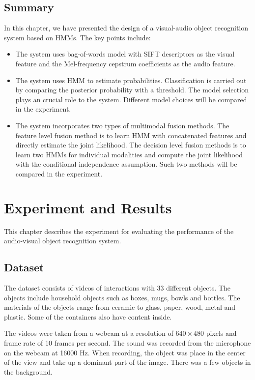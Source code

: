 \documentclass[12pt,final,twoside]{report}
\begin{document}
\section{Summary}
In this chapter, we have presented the design of a visual-audio object recognition system based on HMMs. The key points include:
\begin{itemize}
  \item The system uses bag-of-words model with SIFT descriptors as the visual feature and the Mel-frequency cepstrum coefficients as the audio feature.
  \item The system uses HMM to estimate probabilities. Classification is carried out by comparing the posterior probability with a threshold. The model selection plays an crucial role to the system. Different model choices will be compared in the experiment.
  \item The system incorporates two types of multimodal fusion methods. The feature level fusion method is to learn HMM with concatenated features and directly estimate the joint likelihood. The decision level fusion methods is to learn two HMMs for individual modalities and compute the joint likelihood with the conditional independence assumption. Such two methods will be compared in the experiment.
\end{itemize}

\cleardoublepage
\chapter{Experiment and Results}
This chapter describes the experiment for evaluating the performance of the audio-visual object recognition system. 

\section{Dataset}
The dataset consists of videos of interactions with 33 different objects. The objects include household objects such as boxes, mugs, bowls and bottles. The materials of the objects range from ceramic to glass, paper, wood, metal and plastic. Some of the containers also have content inside.

The videos were taken from a webcam at a resolution of $640 \times 480$ pixels and frame rate of 10 frames per second. The sound was recorded from the microphone on the webcam at 16000 Hz. When recording, the object was place in the center of the view and take up a dominant part of the image. There was a few objects in the background.
\end{document}
